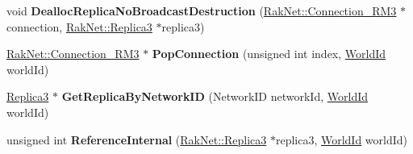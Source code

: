 \begin{DoxyCompactItemize}
\item 
\hypertarget{class_rak_net_1_1_replica_manager3_a8dc664ae9a767b1afedc30f9b577378f}{void {\bfseries Dealloc\-Replica\-No\-Broadcast\-Destruction} (\hyperlink{class_rak_net_1_1_connection___r_m3}{Rak\-Net\-::\-Connection\-\_\-\-R\-M3} $\ast$connection, \hyperlink{class_rak_net_1_1_replica3}{Rak\-Net\-::\-Replica3} $\ast$replica3)}\label{class_rak_net_1_1_replica_manager3_a8dc664ae9a767b1afedc30f9b577378f}

\item 
\hypertarget{class_rak_net_1_1_replica_manager3_ad0b736fc012b299a6d6fa5205b139c73}{\hyperlink{class_rak_net_1_1_connection___r_m3}{Rak\-Net\-::\-Connection\-\_\-\-R\-M3} $\ast$ {\bfseries Pop\-Connection} (unsigned int index, \hyperlink{group___r_e_p_l_i_c_a___m_a_n_a_g_e_r___g_r_o_u_p3_ga44b59af8e882248f61aa41d8ace38bf7}{World\-Id} world\-Id)}\label{class_rak_net_1_1_replica_manager3_ad0b736fc012b299a6d6fa5205b139c73}

\item 
\hypertarget{class_rak_net_1_1_replica_manager3_a84c2111cb72ea841e4fc4b3e4447f084}{\hyperlink{class_rak_net_1_1_replica3}{Replica3} $\ast$ {\bfseries Get\-Replica\-By\-Network\-I\-D} (Network\-I\-D network\-Id, \hyperlink{group___r_e_p_l_i_c_a___m_a_n_a_g_e_r___g_r_o_u_p3_ga44b59af8e882248f61aa41d8ace38bf7}{World\-Id} world\-Id)}\label{class_rak_net_1_1_replica_manager3_a84c2111cb72ea841e4fc4b3e4447f084}

\item 
\hypertarget{class_rak_net_1_1_replica_manager3_abfd449818b159fd1e60c55c39ff9057d}{unsigned int {\bfseries Reference\-Internal} (\hyperlink{class_rak_net_1_1_replica3}{Rak\-Net\-::\-Replica3} $\ast$replica3, \hyperlink{group___r_e_p_l_i_c_a___m_a_n_a_g_e_r___g_r_o_u_p3_ga44b59af8e882248f61aa41d8ace38bf7}{World\-Id} world\-Id)}\label{class_rak_net_1_1_replica_manager3_abfd449818b159fd1e60c55c39ff9057d}

\end{DoxyCompactItemize}
